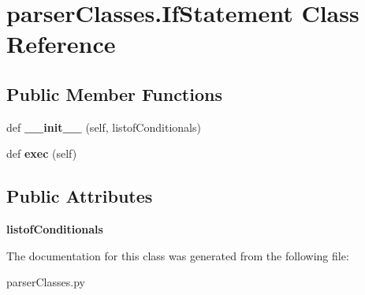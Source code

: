 \hypertarget{classparser_classes_1_1_if_statement}{}\section{parser\+Classes.\+If\+Statement Class Reference}
\label{classparser_classes_1_1_if_statement}
\subsection*{Public Member Functions}
\begin{DoxyCompactItemize}
\item 
\mbox{\label{classparser_classes_1_1_if_statement_a53d538b0688ee1556bcda14383ff7a1c}} 
def {\bfseries \+\_\+\+\_\+init\+\_\+\+\_\+} (self, listof\+Conditionals)
\item 
\mbox{\label{classparser_classes_1_1_if_statement_a53a8b4b35816147f44d1d1e568f60528}} 
def {\bfseries exec} (self)
\end{DoxyCompactItemize}
\subsection*{Public Attributes}
\begin{DoxyCompactItemize}
\item 
\mbox{\label{classparser_classes_1_1_if_statement_a9d440106c71d7c46441ad74cf7142a25}} 
{\bfseries listof\+Conditionals}
\end{DoxyCompactItemize}


The documentation for this class was generated from the following file\+:\begin{DoxyCompactItemize}
\item 
parser\+Classes.\+py\end{DoxyCompactItemize}
